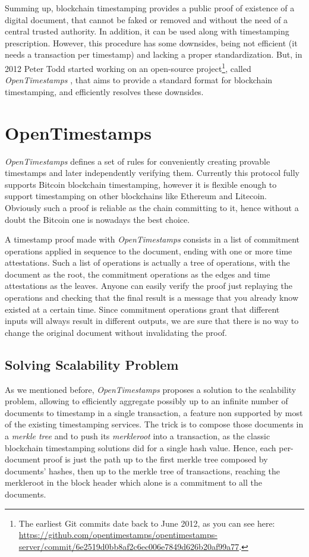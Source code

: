\bigskip
\noindent
Summing up, blockchain timestamping provides a public proof of existence of a digital document, that cannot be faked or removed and without the need of a central trusted authority. In addition, it can be used along with timestamping prescription. However, this procedure has some downsides, being not efficient (it needs a transaction per timestamp) and lacking a proper standardization. But, in 2012 Peter Todd started working on an open-source project\footnote{The earliest Git commits date back to June 2012, as you can see here: \url{https://github.com/opentimestamps/opentimestamps-server/commit/6e2519d0bb8af2c6ec006e7849d626b20af99a77}.}, called \textit{OpenTimestamps} \cite{OTSWeb}, that aims to provide a standard format for blockchain timestamping, and efficiently resolves these downsides.

\bigskip
\section{OpenTimestamps}
\label{sec:ots}
\textit{OpenTimestamps} defines a set of rules for conveniently creating provable timestamps and later independently verifying them. Currently this protocol fully supports Bitcoin blockchain timestamping, however it is flexible enough to support timestamping on other blockchains like Ethereum and Litecoin. Obviously such a proof is reliable as the chain committing to it, hence without a doubt the Bitcoin one is nowadays the best choice.

\bigskip
\noindent
A timestamp proof made with \textit{OpenTimestamps} consists in a list of commitment operations applied in sequence to the document, ending with one or more time attestations. Such a list of operations is actually a tree of operations, with the document as the root, the commitment operations as the edges and time attestations as the leaves. Anyone can easily verify the proof just replaying the operations and checking that the final result is a message that you already know existed at a certain time. Since commitment operations grant that different inputs will always result in different outputs, we are sure that there is no way to change the original document without invalidating the proof.

\bigskip
\subsection{Solving Scalability Problem}
As we mentioned before, \textit{OpenTimestamps} proposes a solution to the scalability problem, allowing to efficiently aggregate possibly up to an infinite number of documents to timestamp in a single transaction, a feature non supported by most of the existing timestamping services. The trick is to compose those documents in a \textit{merkle tree} and to push its \textit{merkleroot} into a transaction, as the classic blockchain timestamping solutions did for a single hash value. Hence, each per-document proof is just the path up to the first merkle tree composed by documents' hashes, then up to the merkle tree of transactions, reaching the merkleroot in the block header which alone is a commitment to all the documents.

